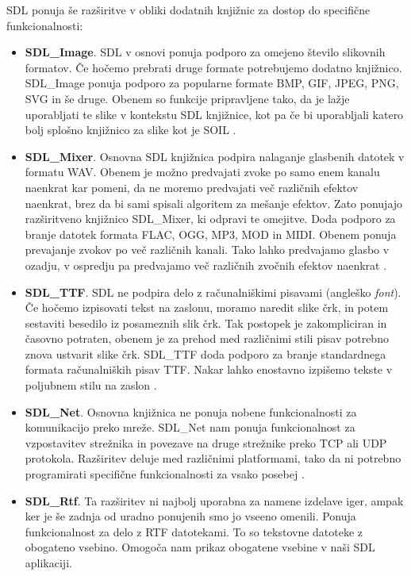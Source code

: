 \documentclass[12pt,a4paper,twoside]{book}
\begin{document}
SDL ponuja še razširitve v obliki dodatnih knjižnic za dostop do specifične funkcionalnosti:
\begin{itemize}
	\item \textbf{SDL\_Image}. SDL v osnovi ponuja podporo za omejeno število slikovnih formatov. Če hočemo prebrati druge formate potrebujemo dodatno knjižnico. SDL\_Image ponuja podporo za popularne formate BMP, GIF, JPEG, PNG, SVG in še druge. Obenem so funkcije pripravljene tako, da je lažje uporabljati te slike v kontekstu SDL knjižnice, kot pa če bi uporabljali katero bolj splošno knjižnico za slike kot je SOIL \cite{sdlimage}.
	\item \textbf{SDL\_Mixer}. Osnovna SDL knjižnica podpira nalaganje glasbenih datotek v formatu WAV. Obenem je možno predvajati zvoke po samo enem kanalu naenkrat kar pomeni, da ne moremo predvajati več različnih efektov naenkrat, brez da bi sami spisali algoritem za mešanje efektov. Zato ponujajo razširitveno knjižnico SDL\_Mixer, ki odpravi te omejitve. Doda podporo za branje datotek formata FLAC, OGG, MP3, MOD in MIDI. Obenem ponuja prevajanje zvokov po več različnih kanali. Tako lahko predvajamo glasbo v ozadju, v ospredju pa predvajamo več različnih zvočnih efektov naenkrat \cite{sdlmixer}.
	\item \textbf{SDL\_TTF}. SDL ne podpira delo z računalniškimi pisavami (angleško \textit{font}). Če hočemo izpisovati tekst na zaslonu, moramo naredit slike črk, in potem sestaviti besedilo iz posameznih slik črk. Tak postopek je zakompliciran in časovno potraten, obenem je za prehod med različnimi stili pisav potrebno znova ustvarit slike črk. SDL\_TTF doda podporo za branje standardnega formata računalniških pisav TTF. Nakar lahko enostavno izpišemo tekste v poljubnem stilu na zaslon \cite{sdlttf}.
	\item \textbf{SDL\_Net}. Osnovna knjižnica ne ponuja nobene funkcionalnosti za komunikacijo preko mreže. SDL\_Net nam ponuja funkcionalnost za vzpostavitev strežnika in povezave na druge strežnike preko TCP ali UDP protokola. Razširitev deluje med različnimi platformami, tako da ni potrebno programirati specifične funkcionalnosti za vsako posebej \cite{sdlnet}.
	\item \textbf{SDL\_Rtf}. Ta razširitev ni najbolj uporabna za namene izdelave iger, ampak ker je še zadnja od uradno ponujenih smo jo vseeno omenili. Ponuja funkcionalnost za delo z RTF datotekami. To so tekstovne datoteke z obogateno vsebino. Omogoča nam prikaz obogatene vsebine v naši SDL aplikaciji.
\end{itemize}
\end{document}

